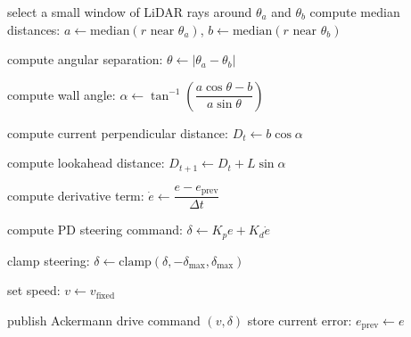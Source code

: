 \documentclass{article}
\begin{document}
\begin{algorithm}[H]
\SetAlgoLined
{}


select a small window of LiDAR rays around $\theta_a$ and $\theta_b$\;
compute median distances:
$a \gets \mathrm{median}(r \text{ near } \theta_a)$,
$b \gets \mathrm{median}(r \text{ near } \theta_b)$\;

compute angular separation:
$\theta \gets |\theta_a - \theta_b|$\;

compute wall angle:
$\alpha \gets \tan^{-1}\left(\dfrac{a\cos\theta - b}{a\sin\theta}\right)$\;

compute current perpendicular distance:
$D_t \gets b\cos\alpha$\;

compute lookahead distance:
$D_{t+1} \gets D_t + L\sin\alpha$\;


compute derivative term:
$\dot{e} \gets \dfrac{e - e_{\text{prev}}}{\Delta t}$\;

compute PD steering command:
$\delta \gets K_p e + K_d \dot{e}$\;

clamp steering:
$\delta \gets \mathrm{clamp}(\delta, -\delta_{\max}, \delta_{\max})$\;

set speed:
$v \gets v_{\text{fixed}}$\;

publish Ackermann drive command $(v, \delta)$\;
store current error:
$e_{\text{prev}} \gets e$\;

\caption{Wall Follower Algorithm}
\end{algorithm}
\end{document}
